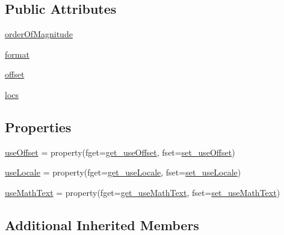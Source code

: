 \subsection*{Public Attributes}
\begin{DoxyCompactItemize}
\item 
\hyperlink{classmatplotlib_1_1ticker_1_1ScalarFormatter_ae045b838b13f47a20dbe13cbd94447ad}{order\+Of\+Magnitude}
\item 
\hyperlink{classmatplotlib_1_1ticker_1_1ScalarFormatter_a33d1953e906b39fb5cfaa2e16c5c0056}{format}
\item 
\hyperlink{classmatplotlib_1_1ticker_1_1ScalarFormatter_af0180d9f773cef773c5e51ed8d3eb324}{offset}
\item 
\hyperlink{classmatplotlib_1_1ticker_1_1ScalarFormatter_a6d5193479f9fcc90f053999eda81f143}{locs}
\end{DoxyCompactItemize}
\subsection*{Properties}
\begin{DoxyCompactItemize}
\item 
\hyperlink{classmatplotlib_1_1ticker_1_1ScalarFormatter_a8bb3fb64e3c3fcbd16cf7d224f8345b2}{use\+Offset} = property(fget=\hyperlink{classmatplotlib_1_1ticker_1_1ScalarFormatter_ad888084ada89fd2462e54346988ee0bb}{get\+\_\+use\+Offset}, fset=\hyperlink{classmatplotlib_1_1ticker_1_1ScalarFormatter_aec6995dab1fd846023a6c48f88e88f9c}{set\+\_\+use\+Offset})
\item 
\hyperlink{classmatplotlib_1_1ticker_1_1ScalarFormatter_a8dd20b19902a213561a9db5e8d95f743}{use\+Locale} = property(fget=\hyperlink{classmatplotlib_1_1ticker_1_1ScalarFormatter_a3d474a0a355cbf753eb9340ae80e4839}{get\+\_\+use\+Locale}, fset=\hyperlink{classmatplotlib_1_1ticker_1_1ScalarFormatter_a03dd9ef155683dca654facedea82de00}{set\+\_\+use\+Locale})
\item 
\hyperlink{classmatplotlib_1_1ticker_1_1ScalarFormatter_a59e6bbff5de710c66bd601df93f15d6d}{use\+Math\+Text} = property(fget=\hyperlink{classmatplotlib_1_1ticker_1_1ScalarFormatter_a1687f734f10eac1abd32d52ef58feadd}{get\+\_\+use\+Math\+Text}, fset=\hyperlink{classmatplotlib_1_1ticker_1_1ScalarFormatter_ac3a831d21e643c139e1bbaebb1027eb7}{set\+\_\+use\+Math\+Text})
\end{DoxyCompactItemize}
\subsection*{Additional Inherited Members}


